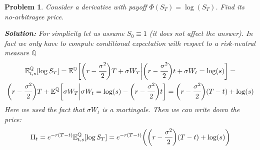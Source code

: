 \documentclass[a4paper, 12pt]{article}
\theoremstyle{problemstyle}
\newtheorem{problem}{Problem}[section]
\newenvironment{solution}
{\textit{\textbf{Solution:}}}
{}
\newcommand{\E}{\mathbb{E}}
\begin{document}
\begin{problem}
	Consider a derivative with payoff $\Phi(S_T) = \log(S_T)$. Find its no-arbitragee price.
	
	\begin{solution}
		For simplicity let us assume $S_0 \equiv 1$ (it does not affect the answer). In fact we only have to compute conditional expectation with respect to a risk-neutral measure $\mathbb{Q}$
		\begin{multline}
		\E^{\mathbb{Q}}_{t, s}[\log S_T] = 
		\E^{\mathbb{Q}}\bigg[ 
		\bigg(r  - \cfrac{\sigma^2}{2}\bigg)T + \sigma W_T \bigg| 
		\bigg(r  - \cfrac{\sigma^2}{2}\bigg)t + \sigma W_t = \log(s)
		\bigg] = \\
		\bigg(r  - \cfrac{\sigma^2}{2}\bigg)T  +
		\E^{\mathbb{Q}}\bigg[ \sigma W_T \bigg| 
		\sigma W_t = \log(s) - \bigg(r  - \cfrac{\sigma^2}{2}\bigg)t 
		\bigg] = 
			\bigg(r  - \cfrac{\sigma^2}{2}\bigg)(T-t) +\log(s) 
		\end{multline}
		Here we used the fact that $\sigma W_t$ is a martingale. Then we can write down the price:
		\begin{equation}
		\Pi_t = e^{-r(T-t)}\E^{\mathbb{Q}}_{t, s}[\log S_T]  = e^{-r(T-t)}\bigg(\bigg(r  - \cfrac{\sigma^2}{2}\bigg)(T-t) +\log(s)\bigg) 
		\end{equation}
	\end{solution}
\end{problem}
\end{document}
